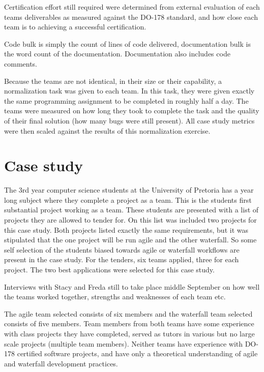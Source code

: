 \documentclass[conference]{IEEEtran}
\begin{document}
Certification effort still required were determined from external evaluation of each teams deliverables as measured against the DO-178 standard, and how close each team is to achieving a successful certification.

Code bulk is simply the count of lines of code delivered, documentation bulk is the word count of the documentation. Documentation also includes code comments.

Because the teams are not identical, in their size or their capability, a normalization task was given to each team. In this task, they were given exactly the same programming assignment to be completed in roughly half a day. The teams were measured on how long they took to complete the task and the quality of their final solution (how many bugs were still present). All case study metrics were then scaled against the results of this normalization exercise.

\section{Case study}

The 3rd year computer science students at the University of Pretoria has a year long subject where they complete a project as a team. This is the students first substantial project working as a team. These students are presented with a list of projects they are allowed to tender for. On this list was included two projects for this case study. Both projects listed exactly the same requirements, but it was stipulated that the one project will be run agile and the other waterfall. So some self selection of the students biased towards agile or waterfall workflows are present in the case study. For the tenders, six teams applied, three for each project. The two best applications were selected for this case study.

Interviews with Stacy and Freda still to take place middle September on how well the teams worked together, strengths and weaknesses of each team etc.

The agile team selected consists of six members and the waterfall team selected consists of five members. Team members from both teams have some experience with class projects they have completed, served as tutors in various but no large scale projects (multiple team members). Neither teams have experience with DO-178 certified software projects, and have only a theoretical understanding of agile and waterfall development practices.  
\end{document}
